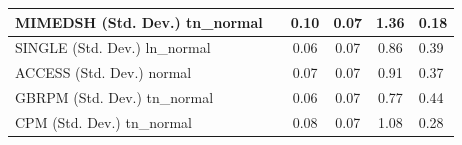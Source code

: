 \begin{table}
\begin{center}
\begin{tabular}{|l|l|c|c|c|l|}
			\hline
			MIMEDSH (Std. Dev.) tn_normal &  & 0.10 & 0.07 & 1.36 & 0.18 \\
			\hline
			SINGLE (Std. Dev.) ln_normal &  & 0.06 & 0.07 & 0.86 & 0.39 \\
			\hline
			ACCESS (Std. Dev.) normal &  & 0.07 & 0.07 & 0.91 & 0.37 \\
			\hline
			GBRPM (Std. Dev.) tn_normal &  & 0.06 & 0.07 & 0.77 & 0.44 \\
			\hline
			CPM (Std. Dev.) tn_normal &  & 0.08 & 0.07 & 1.08 & 0.28 \\
			\hline
		\end{tabular}
	\end{center}
\end{table}